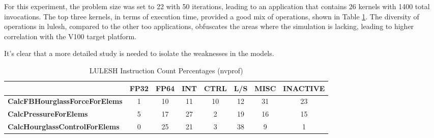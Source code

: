 For this experiment, the problem size was set to 22 with 50 iterations, leading
to an application that contains 26 kernels with 1400 total invocations. The top
three kernels, in terms of execution time, provided a good mix of operations,
shown in Table \ref{tab:lulesh}. The diversity of operations in lulesh, compared
to the other too applications, obfuscates the areas where the simulation is
lacking, leading to higher correlation with the V100 target platform.

It's clear that a more detailed study is needed to isolate the weaknesses in the models.


   \begin{table}[!htbp]
      \centering
      \setlength{\belowcaptionskip}{6pt plus 1pt minus 1pt}
      \captionsetup{width=.75\textwidth}
      \caption[LULESH Instruction Count Percentages]{LULESH Instruction Count Percentages (nvprof)}
      \begin{tabular}{l|c|c|c|c|c|c|c|}
         \cline{2-8}
                                                                     & \textbf{FP32} & \textbf{FP64} & \textbf{INT} & \textbf{CTRL} & \textbf{L/S} & \textbf{MISC} & \textbf{INACTIVE} \\ \hline
         \multicolumn{1}{|l|}{\textbf{CalcFBHourglassForceForElems}} & 1             & 10            & 11           & 10            & 12           & 31            & 23                \\ \hline
         \multicolumn{1}{|l|}{\textbf{CalcPressureForElems}}         & 5             & 17            & 27           & 2             & 19           & 16            & 15                \\ \hline
         \multicolumn{1}{|l|}{\textbf{CalcHourglassControlForElems}} & 0             & 25            & 21           & 3             & 38           & 9             & 1                 \\ \hline
      \end{tabular}
      \label{tab:lulesh}
   \end{table}


